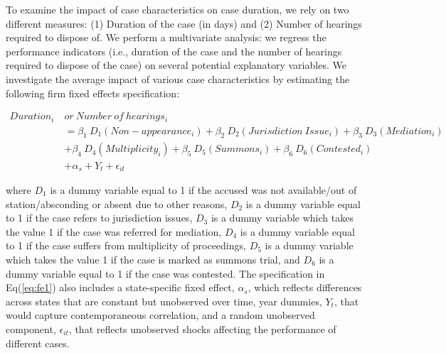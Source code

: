 \documentclass[12pt,a4paper]{article}
\begin{document}
	To examine the impact of case characteristics on case duration, we rely on two different measures: (1) Duration of the case (in days) and (2) Number of hearings required to dispose of. We perform a multivariate analysis: we regress the performance indicators (i.e., duration of the case and the number of hearings required to dispose of the case) on several potential explanatory variables. We investigate the average impact of various case characteristics by estimating
	the following firm fixed effects specification:
	
	\begin{equation}\label{eq:fe1}
		\begin{split}
			Duration_i \ & or \ Number \ of \ hearings_i \\
			& = \beta_1 \ D_1(Non-appearance_i) + \beta_2 \ D_2(Jurisdiction \ Issue_i) + \beta_3 \ D_3(Mediation_i) \\
			& + \beta_4 \ D_4(Multiplicity_i) + \beta_5 \ D_5(Summons_i) + \beta_6 \ D_6(Contested_i) \\
			& + \alpha_s + Y_t + \epsilon_{it}
		\end{split}
	\end{equation}
	
	where $D_1$ is a dummy variable equal to 1 if the accused was not available/out of station/absconding or absent due to other reasons, $D_2$ is a dummy variable equal to 1 if the case refers to jurisdiction issues, $D_3$ is a dummy variable which takes the value 1 if the case was referred for mediation, $D_4$ is a dummy variable equal to 1 if the case suffers from multiplicity of proceedings, $D_5$ is a dummy variable which takes the value 1 if the case is marked as summons trial, and $D_6$ is a dummy variable equal to 1 if the case was contested. The specification in Eq(\ref{eq:fe1}) also includes a state-specific fixed effect, $\alpha_s$, which reflects differences across states that are constant but unobserved over time, year dummies, $Y_t$, that would capture contemporaneous correlation, and a random unobserved component, $\epsilon_{it}$, that reflects unobserved shocks affecting the performance of different cases.
	
	
	
\end{document}
